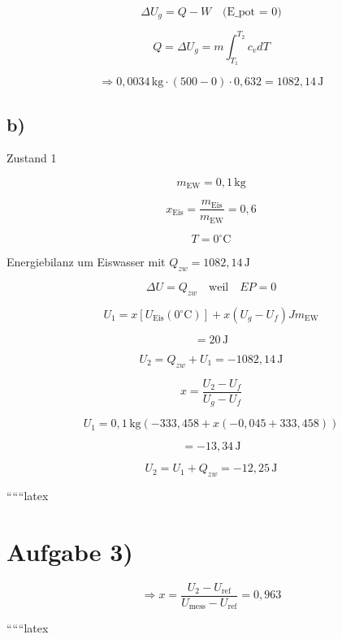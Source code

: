 \[
\Delta U_g = Q - W \quad \text{(E_{pot} = 0)}
\]

\[
Q = \Delta U_g = m \int_{T_1}^{T_2} c_v dT
\]

\[
\Rightarrow 0,0034 \, \text{kg} \cdot (500 - 0) \cdot 0,632 = 1082,14 \, \text{J}
\]

\subsection*{b)}
Zustand 1

\[
m_{\text{EW}} = 0,1 \, \text{kg}
\]

\[
x_{\text{Eis}} = \frac{m_{\text{Eis}}}{m_{\text{EW}}} = 0,6
\]

\[
T = 0^\circ \text{C}
\]

Energiebilanz um Eiswasser mit \( Q_{zw} = 1082,14 \, \text{J} \)

\[
\Delta U = Q_{zw} \quad \text{weil} \quad EP = 0
\]

\[
U_1 = x \left[ U_{\text{Eis}}(0^\circ \text{C}) \right] + x \left( U_g - U_f \right) J m_{\text{EW}}
\]

\[
= 20 \, \text{J}
\]

\[
U_2 = Q_{zw} + U_1 = -1082,14 \, \text{J}
\]

\[
x = \frac{U_2 - U_f}{U_g - U_f}
\]

\[
U_1 = 0,1 \, \text{kg} \left( -333,458 + x \left( -0,045 + 333,458 \right) \right)
\]

\[
= -13,34 \, \text{J}
\]

\[
U_2 = U_1 + Q_{zw} = -12,25 \, \text{J}
\]

``````latex


\section*{Aufgabe 3)}

\[
\Rightarrow x = \frac{U_2 - U_{\text{ref}}}{U_{\text{mess}} - U_{\text{ref}}} = 0{,}963
\]

``````latex


